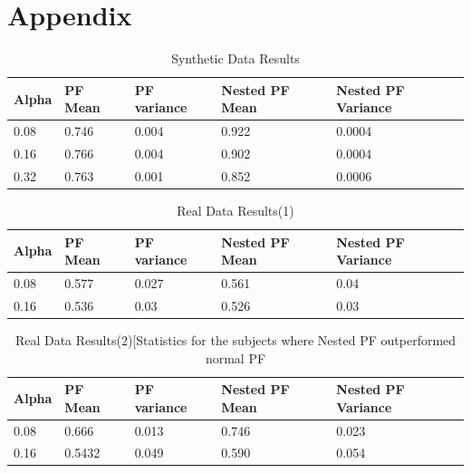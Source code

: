 \documentclass[12pt,letterpaper]{article}
\begin{document}
\section{Appendix}
\begin{table}[!ht]
\begin{center} 
\caption{Synthetic Data Results} 

\begin{tabular}{lllll} 
\hline
 Alpha & PF Mean & PF variance & Nested PF Mean & Nested PF Variance \\
\hline
0.08 & 0.746 & 0.004 & 0.922 & 0.0004\\ 
 0.16 & 0.766 & 0.004 & 0.902 & 0.0004  \\
 0.32 & 0.763 & 0.001 & 0.852 & 0.0006 \\
\hline
\end{tabular} 
\end{center} 
\end{table}
\begin{table}[!ht]
\begin{center} 
\caption{Real Data Results(1)} 

\begin{tabular}{lllll} 
\hline
 Alpha & PF Mean & PF variance & Nested PF Mean & Nested PF Variance \\
\hline
0.08 & 0.577 & 0.027 & 0.561 & 0.04\\ 
0.16 & 0.536 & 0.03 & 0.526 & 0.03  \\
\hline
\end{tabular} 
\end{center} 
\end{table}
\begin{table}[!ht]
\begin{center} 
\caption{Real Data Results(2)[Statistics for the subjects where Nested PF outperformed normal PF} 

\begin{tabular}{lllll} 
\hline
 Alpha & PF Mean & PF variance & Nested PF Mean & Nested PF Variance \\
\hline
0.08 & 0.666 & 0.013 & 0.746 &  0.023\\ 
0.16 & 0.5432 & 0.049 & 0.590 & 0.054  \\
\hline
\end{tabular} 
\end{center} 
\end{table}
\end{document}
